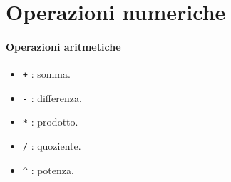\documentclass[12pt,a4paper,oneside]{book}
\begin{document}
\section{Operazioni numeriche}

\paragraph{Operazioni aritmetiche}
\begin{itemize}

	\item	\texttt{+} : somma.
	
	\item	\texttt{-} : differenza.
	
	\item	\texttt{*} : prodotto.
	
	\item	\texttt{/} : quoziente.
	
	\item	\texttt{\^} : potenza.
	
\end{itemize}	
	
	
\end{document}

